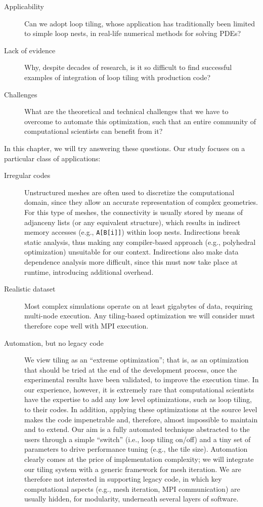 \begin{description}
\item[Applicability] Can we adopt loop tiling, whose application has traditionally been limited to simple loop nests, in real-life numerical methods for solving PDEs?
\item[Lack of evidence] Why, despite decades of research, is it so difficult to find successful examples of integration of loop tiling with production code? 
\item[Challenges] What are the theoretical and technical challenges that we have to overcome to automate this optimization, such that an entire community of computational scientists can benefit from it?
\end{description}

In this chapter, we will try answering these questions. Our study focuses on a particular class of applications:
\begin{description}
\item[Irregular codes] Unstructured meshes are often used to discretize the computational domain, since they allow an accurate representation of complex geometries. For this type of meshes, the connectivity is usually stored by means of adjanceny lists (or any equivalent structure), which results in indirect memory accesses (e.g., \texttt{A[B[i]]}) within loop nests. Indirections break static analysis, thus making any compiler-based approach (e.g., polyhedral optimization) unsuitable for our context. Indirections also make data dependence analysis more difficult, since this must now take place at runtime, introducing additional overhead.
\item[Realistic dataset] Most complex simulations operate on at least gigabytes of data, requiring multi-node execution. Any tiling-based optimization we will consider must therefore cope well with MPI execution.
\item[Automation, but no legacy code] We view tiling as an ``extreme optimization''; that is, as an optimization that should be tried at the end of the development process, once the experimental results have been validated, to improve the execution time. In our experience, however, it is extremely rare that computational scientists have the expertise to add any low level optimizations, such as loop tiling, to their codes. In addition, applying these optimizations at the source level makes the code impenetrable and, therefore, almost impossible to maintain and to extend. Our aim is a fully automated technique abstracted to the users through a simple ``switch'' (i.e., loop tiling on/off) and a tiny set of parameters to drive performance tuning (e.g., the tile size). Automation clearly comes at the price of implementation complexity; we will integrate our tiling system with a generic framework for mesh iteration. We are therefore not interested in supporting legacy code, in which key computational aspects (e.g., mesh iteration, MPI communication) are usually hidden, for modularity, underneath several layers of software.
\end{description}


